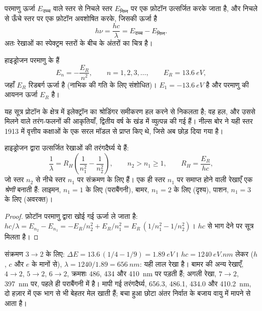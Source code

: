 परमाणु ऊर्जा $E_{\text{उच्च}}$ वाले स्तर से निचले स्तर
$E_{\text{निम्न}}$ पर एक फ़ोटॉन उत्सर्जित करके जाता है, और निचले से ऊँचे स्तर
पर एक फ़ोटॉन अवशोषित करके, जिसकी ऊर्जा है
\[
  h\nu = \frac{hc}{\lambda} = E_{\text{उच्च}} - E_{\text{निम्न}} .
\]
अतः रेखाओं का स्पेक्ट्रम स्तरों के बीच के अंतरों का चित्र है।

\begin{theorem}[हाइड्रोजन परमाणु के ऊर्जा स्तर]\label{thm:b1:quantum-numbers:levels}
हाइड्रोजन परमाणु के  हैं
\[
  E_n = -\frac{E_R}{n^2}, \qquad n = 1, 2, 3, \dots,
  \qquad E_R = \qty{13.6}{eV},
\]
जहाँ $E_R$ रिडबर्ग ऊर्जा है (नाभिक की गति के लिए संशोधित)। 
$E_1 = \qty{-13.6}{eV}$ है और परमाणु की आयनन ऊर्जा
$E_R$ है।
\end{theorem}
\admitted

\begin{remark}[सूत्र कहाँ से आता है]\label{rem:b1:quantum-numbers:schrodinger}
यह सूत्र प्रोटॉन के क्षेत्र में इलेक्ट्रॉन का श्रोडिंगर समीकरण हल करने से
निकलता है; वह हल, और उससे मिलने वाले तरंग-फलनों की आकृतियाँ, द्वितीय वर्ष के
खंड में व्युत्पन्न की गई हैं। नील्स बोर ने यही स्तर 1913 में वृत्तीय कक्षाओं
के एक सरल मॉडल से प्राप्त किए थे, जिसे अब छोड़ दिया गया है।
\end{remark}

\begin{proposition}[रिडबर्ग सूत्र]\label{prop:b1:quantum-numbers:rydberg}
हाइड्रोजन द्वारा उत्सर्जित रेखाओं की तरंगदैर्घ्य ये हैं:
\[
  \frac{1}{\lambda} = R_H\left(\frac{1}{n_1^2} - \frac{1}{n_2^2}\right),
  \qquad n_2 > n_1 \ge 1, \qquad R_H = \frac{E_R}{hc},
\]
जो स्तर $n_2$ से नीचे स्तर $n_1$ पर संक्रमण के लिए हैं। एक ही स्तर $n_1$ पर
समाप्त होने वाली रेखाएँ एक \emph{श्रेणी} बनाती हैं: लाइमन, $n_1 = 1$ के लिए
(पराबैंगनी), बामर, $n_1 = 2$ के लिए (दृश्य), पाशन, $n_1 = 3$ के लिए
(अवरक्त)।
\end{proposition}

\begin{proof}
फ़ोटॉन परमाणु द्वारा खोई गई ऊर्जा ले जाता है:
$hc/\lambda = E_{n_2} - E_{n_1} = -E_R/n_2^2 + E_R/n_1^2
= E_R\,(1/n_1^2 - 1/n_2^2)$। $hc$ से भाग देने पर सूत्र मिलता है।
\end{proof}

\begin{example}[हाइड्रोजन की लाल रेखा]\label{ex:b1:quantum-numbers:halpha}
संक्रमण $3 \to 2$ के लिए: $\Delta E = 13.6\,(1/4 - 1/9) =
\qty{1.89}{eV}$। $hc = \qty{1240}{eV.nm}$ लेकर ($h$,
$c$ और $e$ के मानों से), $\lambda = 1240/1.89 = \qty{656}{nm}$: यही लाल रेखा है।
बामर की अन्य रेखाएँ, $4 \to 2$, $5 \to 2$, $6 \to 2$, क्रमशः 486,
434 और \qty{410}{nm} पर पड़ती हैं; अगली रेखा, $7 \to 2$, \qty{397}{nm} पर,
पहले ही पराबैंगनी में है। मापी गई तरंगदैर्घ्य, 656.3, 486.1, 434.0
और \qty{410.2}{nm}, दो हज़ार में एक भाग से भी बेहतर मेल खाती हैं; बचा हुआ
छोटा अंतर निर्वात के बजाय वायु में मापने से आता है।
\end{example}

